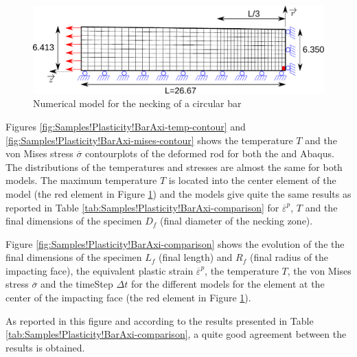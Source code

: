 \begin{figure}[h]
\begin{centering}
\includegraphics[width=0.75\columnwidth]{Figures/BarNecking}
\par\end{centering}
\caption{Numerical model for the necking of a circular bar\label{fig:Samples!Plasticity!NeckingAxi}}
\end{figure}

Figures \ref{fig:Samples!Plasticity!BarAxi-temp-contour} and \ref{fig:Samples!Plasticity!BarAxi-mises-contour}
shows the temperature $T$ and the von Mises stress $\overline{\sigma}$
contourplots of the deformed rod for both the \DynELA and Abaqus.
The distributions of the temperatures and stresses are almost the
same for both models. The maximum temperature $T$ is located into
the center element of the model (the red element in Figure \ref{fig:Samples!Plasticity!NeckingAxi})
and the models give quite the same results as reported in Table \ref{tab:Samples!Plasticity!BarAxi-comparison}
for $\overline{\varepsilon}^{p}$, $T$ and the final dimensions of
the specimen $D_{f}$ (final diameter of the necking zone).

Figure \ref{fig:Samples!Plasticity!BarAxi-comparison} shows the evolution
of the the final dimensions of the specimen $L_{f}$ (final length)
and $R_{f}$ (final radius of the impacting face), the equivalent
plastic strain $\overline{\varepsilon}^{p}$, the temperature $T$,
the von Mises stress $\overline{\sigma}$ and the timeStep $\Delta t$
for the different models for the element at the center of the impacting
face (the red element in Figure \ref{fig:Samples!Plasticity!NeckingAxi}).

As reported in this figure and according to the results presented
in Table \ref{tab:Samples!Plasticity!BarAxi-comparison}, a quite
good agreement between the results is obtained.

